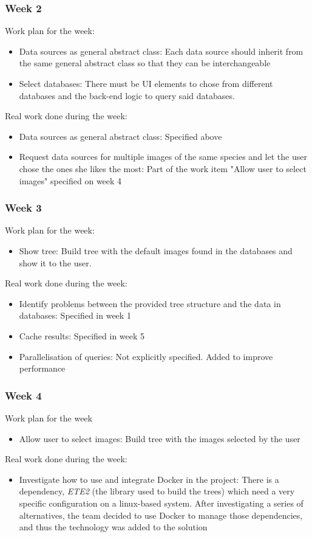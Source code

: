 \documentclass[10pt]{article}
\begin{document}
  \subsubsection{Week 2}
	Work plan for the week:
	\begin{itemize}
		\item Data sources as general abstract class: Each data source should inherit from the same general abstract class so that they can be interchangeable
		\item Select databases: There must be UI elements to chose from different databases and the back-end logic to query said databases.
	\end{itemize}
	Real work done during the week:
	\begin{itemize}
		\item Data sources as general abstract class: Specified above
		\item Request data sources for multiple images of the same species and let the user chose the ones she likes the most: Part of the work item "Allow user to select images" specified on week 4
	\end{itemize}
  \subsubsection{Week 3}
  	Work plan for the week:
	\begin{itemize}
  		\item Show tree: Build tree with the default images found in the databases and show it to the user.
	\end{itemize}
	Real work done during the week:
	\begin{itemize}
		\item Identify problems  between the provided tree structure and the data in databases: Specified in week 1
		\item Cache results: Specified in week 5
		\item Parallelisation of queries: Not explicitly specified. Added to improve performance
	\end{itemize}
  \subsubsection{Week 4}
  	Work plan for the week
  	\begin{itemize}
  		\item Allow user to select images: Build tree with the images selected by the user
	\end{itemize}
	Real work done during the week:
	\begin{itemize}
		\item Investigate how to use and integrate Docker in the project: There is a dependency, \textit{ETE2} (the library used to build the trees) which need a very specific configuration on a linux-based system. After investigating a series of alternatives, the team decided to use Docker to manage those dependencies, and thus the technology was added to the solution
	\end{itemize}
\end{document}
